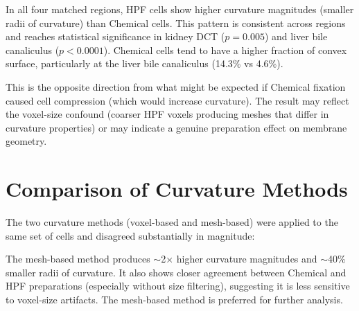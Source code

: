 \documentclass[times, twoside]{zHenriquesLab-StyleBioRxiv}
\begin{document}
In all four matched regions, HPF cells show higher curvature magnitudes (smaller radii of curvature) than Chemical cells. This pattern is consistent across regions and reaches statistical significance in kidney DCT ($p = 0.005$) and liver bile canaliculus ($p < 0.0001$). Chemical cells tend to have a higher fraction of convex surface, particularly at the liver bile canaliculus (14.3\% vs 4.6\%).

This is the opposite direction from what might be expected if Chemical fixation caused cell compression (which would increase curvature). The result may reflect the voxel-size confound (coarser HPF voxels producing meshes that differ in curvature properties) or may indicate a genuine preparation effect on membrane geometry.

\section*{Comparison of Curvature Methods}

The two curvature methods (voxel-based and mesh-based) were applied to the same set of cells and disagreed substantially in magnitude:

\begin{table}[h]
\centering
{}
\end{table}

The mesh-based method produces $\sim$2$\times$ higher curvature magnitudes and $\sim$40\% smaller radii of curvature. It also shows closer agreement between Chemical and HPF preparations (especially without size filtering), suggesting it is less sensitive to voxel-size artifacts. The mesh-based method is preferred for further analysis.
\end{document}
